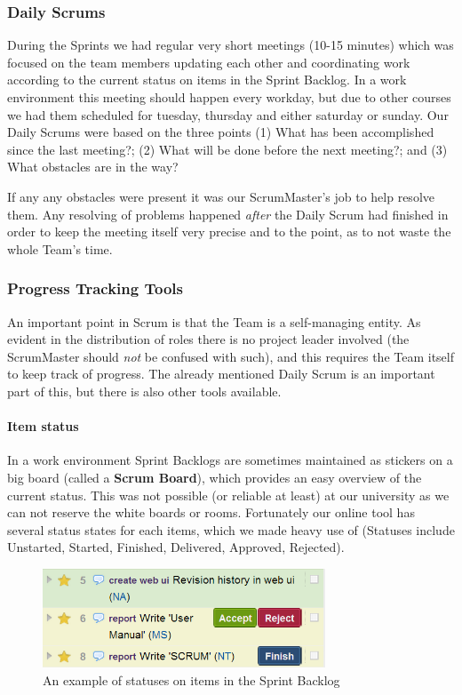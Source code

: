 \subsubsection{Daily Scrums}
During the Sprints we had regular very short meetings (10-15 minutes) which was focused on the team members updating each other and coordinating work according to the current status on items in the Sprint Backlog. In a work environment this meeting should happen every workday, but due to other courses we had them scheduled for tuesday, thursday and either saturday or sunday. Our Daily Scrums were based on the three points (1) What has been accomplished since the last meeting?; (2) What will be done before the next meeting?; and (3) What obstacles are in the way?

If any any obstacles were present it was our ScrumMaster's job to help resolve them. Any resolving of problems happened \emph{after} the Daily Scrum had finished in order to keep the meeting itself very precise and to the point, as to not waste the whole Team's time.


\subsubsection{Progress Tracking Tools}
An important point in Scrum is that the Team is a self-managing entity. As evident in the distribution of roles there is no project leader involved (the ScrumMaster should \emph{not} be confused with such), and this requires the Team itself to keep track of progress. The already mentioned Daily Scrum is an important part of this, but there is also other tools available.

\paragraph{Item status}
In a work environment Sprint Backlogs are sometimes maintained as stickers on a big board (called a \textbf{Scrum Board}), which provides an easy overview of the current status. This was not possible (or reliable at least) at our university as we can not reserve the white boards or rooms. Fortunately our online tool has several status states for each items, which we made heavy use of (Statuses include Unstarted, Started, Finished, Delivered, Approved, Rejected).
\begin{figure}[htb]
	\centering
	\includegraphics[width=0.75\textwidth]{SCRUM/graphics/status-example.png}
	\caption{An example of statuses on items in the Sprint Backlog}
	\label{fig:item-status}
\end{figure}

